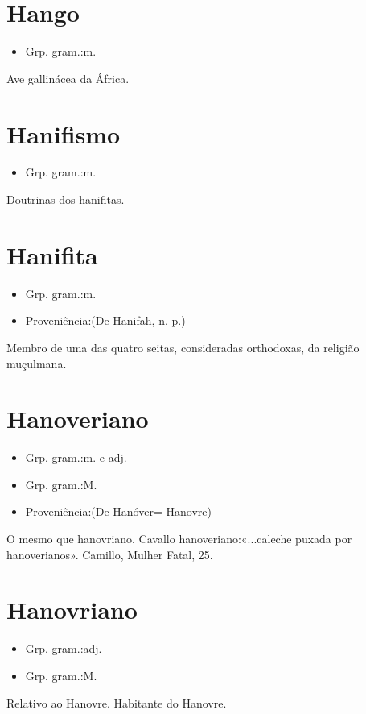 \documentclass{article}
\begin{document}
\section{Hango}
\begin{itemize}
\item {Grp. gram.:m.}
\end{itemize}
Ave gallinácea da África.
\section{Hanifismo}
\begin{itemize}
\item {Grp. gram.:m.}
\end{itemize}
Doutrinas dos hanifitas.
\section{Hanifita}
\begin{itemize}
\item {Grp. gram.:m.}
\end{itemize}
\begin{itemize}
\item {Proveniência:(De \textunderscore Hanifah\textunderscore , n. p.)}
\end{itemize}
Membro de uma das quatro seitas, consideradas orthodoxas, da religião muçulmana.
\section{Hanoveriano}
\begin{itemize}
\item {Grp. gram.:m.  e  adj.}
\end{itemize}
\begin{itemize}
\item {Grp. gram.:M.}
\end{itemize}
\begin{itemize}
\item {Proveniência:(De \textunderscore Hanóver\textunderscore  = \textunderscore Hanovre\textunderscore )}
\end{itemize}
O mesmo que \textunderscore hanovriano\textunderscore .
Cavallo hanoveriano:«\textunderscore ...caleche puxada por hanoverianos\textunderscore ». Camillo, \textunderscore Mulher Fatal\textunderscore , 25.
\section{Hanovriano}
\begin{itemize}
\item {Grp. gram.:adj.}
\end{itemize}
\begin{itemize}
\item {Grp. gram.:M.}
\end{itemize}
Relativo ao Hanovre.
Habitante do Hanovre.
\end{document}

